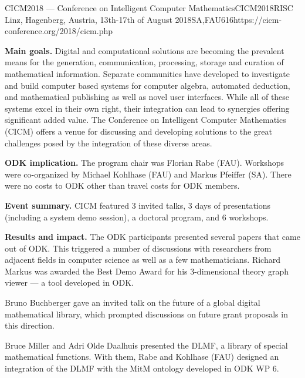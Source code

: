 \begin{event}{CICM2018 --- Conference on Intelligent Computer Mathematics}{CICM2018}{RISC Linz, Hagenberg, Austria, 13th-17th of August 2018}{SA,FAU}{61}{6}{https://cicm-conference.org/2018/cicm.php}

\textbf{Main goals.}
Digital and computational solutions are becoming the prevalent means for the generation, communication, processing, storage and curation of mathematical information.
Separate communities have developed to investigate and build computer based systems for computer algebra, automated deduction, and mathematical publishing as well as novel user interfaces.
While all of these systems excel in their own right, their integration can lead to synergies offering significant added value.
The Conference on Intelligent Computer Mathematics (CICM) offers a venue for discussing and developing solutions to the great challenges posed by the integration of these diverse areas. 

\textbf{ODK implication.}
The program chair was Florian Rabe (FAU).
Workshops were co-organized by Michael Kohlhase (FAU) and Markus Pfeiffer (SA).
There were no costs to ODK other than travel costs for ODK members.

\textbf{Event summary.}
CICM featured 3 invited talks, 3 days of presentations (including a system demo session), a doctoral program, and 6 workshops.

\textbf{Results and impact.}
The ODK participants presented several papers that came out of ODK.
This triggered a number of discussions with researchers from adjacent fields in computer science as well as a few mathematicians.
Richard Markus was awarded the Best Demo Award for his 3-dimensional theory graph viewer --- a tool developed in ODK.

Bruno Buchberger gave an invited talk on the future of a global digital mathematical library, which prompted discussions on future grant proposals in this direction.

Bruce Miller and Adri Olde Daalhuis presented the DLMF, a library of special mathematical functions.
With them, Rabe and Kohlhase (FAU) designed an integration of the DLMF with the MitM ontology developed in ODK WP 6.

\end{event}
